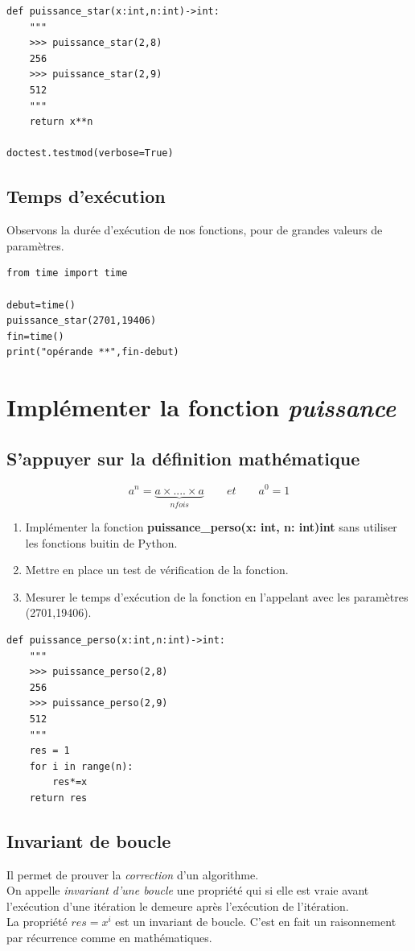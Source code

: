 \documentclass[a4paper,11pt]{article}
\begin{document}
\begin{Form}
\begin{lstlisting}
def puissance_star(x:int,n:int)->int:
    """
    >>> puissance_star(2,8)
    256
    >>> puissance_star(2,9)
    512
    """
    return x**n

doctest.testmod(verbose=True)
\end{lstlisting}
\subsection{Temps d'exécution}
Observons la durée d'exécution de nos fonctions, pour de grandes valeurs de paramètres.
\begin{lstlisting}
from time import time

debut=time()
puissance_star(2701,19406)
fin=time()
print("opérande **",fin-debut)
\end{lstlisting}
\section{Implémenter la fonction \emph{puissance}}
\subsection{S'appuyer sur la définition mathématique}
$$a^n=\underbrace{a ×....× a}_{n fois}\qquad et \qquad a^0=1$$
\begin{activite}
\begin{enumerate}
\item Implémenter la fonction \textbf{puissance\_perso(x: int, n: int)\;\rightarrow\;int} sans utiliser les fonctions buitin de Python.
\item Mettre en place un test de vérification de la fonction.
\item Mesurer le temps d'exécution de la fonction en l'appelant avec les paramètres (2701,19406).
\end{enumerate}
\end{activite}
\begin{commentprof}
\begin{lstlisting}
def puissance_perso(x:int,n:int)->int:
    """
    >>> puissance_perso(2,8)
    256
    >>> puissance_perso(2,9)
    512
    """
    res = 1
    for i in range(n):
        res*=x
    return res
\end{lstlisting}
\end{commentprof}
\subsection{Invariant de boucle}
Il permet de prouver la \emph{correction} d'un algorithme.\\
On appelle \emph{invariant d’une boucle} une propriété qui si elle est vraie avant l’exécution d’une itération le demeure après l’exécution de l’itération.\\
La propriété $res = x^i$ est un invariant de boucle. C'est en fait un raisonnement par récurrence comme en mathématiques.

\end{Form}
\end{document}

